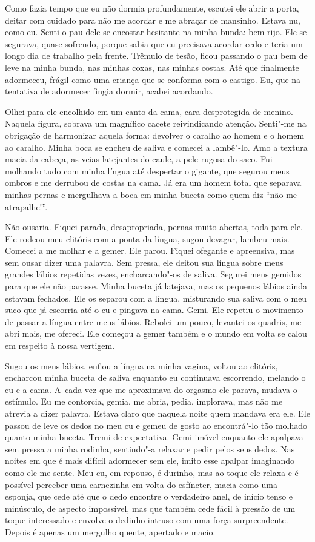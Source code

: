 Como fazia tempo que eu não dormia profundamente, escutei ele abrir a
porta, deitar com cuidado para não me acordar e me abraçar de mansinho.
Estava nu, como eu. Senti o pau dele se encostar hesitante na minha
bunda: bem rijo. Ele se segurava, quase sofrendo, porque sabia que eu
precisava acordar cedo e teria um longo dia de trabalho pela frente.
Trêmulo de tesão, ficou passando o pau bem de leve na minha bunda, nas
minhas coxas, nas minhas costas. Até que finalmente adormeceu, frágil
como uma criança que se conforma com o castigo. Eu, que na tentativa de
adormecer fingia dormir, acabei acordando.

Olhei para ele encolhido em um canto da cama, cara desprotegida de
menino. Naquela figura, sobrava um magnífico cacete reivindicando
atenção. Senti"-me na obrigação de harmonizar aquela forma: devolver o
caralho ao homem e o homem ao caralho. Minha boca se encheu de saliva e
comecei a lambê"-lo. Amo a textura macia da cabeça, as veias latejantes
do caule, a pele rugosa do saco. Fui molhando tudo com minha língua até
despertar o gigante, que segurou meus ombros e me derrubou de costas na
cama. Já era um homem total que separava minhas pernas e mergulhava a
boca em minha buceta como quem diz ``não me atrapalhe!''.

Não ousaria. Fiquei parada, desapropriada, pernas muito abertas, toda
para ele. Ele rodeou meu clitóris com a ponta da língua, sugou devagar,
lambeu mais. Comecei a me molhar e a gemer. Ele parou. Fiquei ofegante e
apreensiva, mas sem ousar dizer uma palavra. Sem pressa, ele deitou sua
língua sobre meus grandes lábios repetidas vezes, encharcando"-os de
saliva. Segurei meus gemidos para que ele não parasse. Minha buceta já
latejava, mas os pequenos lábios ainda estavam fechados. Ele os separou
com a língua, misturando sua saliva com o meu suco que já escorria até o
cu e pingava na cama. Gemi. Ele repetiu o movimento de passar a língua
entre meus lábios. Rebolei um pouco, levantei os quadris, me abri mais,
me ofereci. Ele começou a gemer também e o mundo em volta se calou em
respeito à nossa vertigem.

Sugou os meus lábios, enfiou a língua na minha vagina, voltou ao
clitóris, encharcou minha buceta de saliva enquanto eu continuava
escorrendo, melando o cu e a cama. A~cada vez que me aproximava do
orgasmo ele parava, mudava o estímulo. Eu me contorcia, gemia, me abria,
pedia, implorava, mas não me atrevia a dizer palavra. Estava claro que
naquela noite quem mandava era ele. Ele passou de leve os dedos no meu
cu e gemeu de gosto ao encontrá"-lo tão molhado quanto minha
buceta. Tremi de expectativa. Gemi imóvel enquanto ele apalpava sem
pressa a minha rodinha, sentindo"-a relaxar e pedir pelos seus dedos. Nas
noites em que é mais difícil adormecer sem ele, imito esse apalpar
imaginando como ele me sente. Meu cu, em repouso, é durinho, mas ao
toque ele relaxa e é possível perceber uma carnezinha em volta do
esfíncter, macia como uma esponja, que cede até que o dedo
encontre o verdadeiro anel, de início tenso e minúsculo, de aspecto
impossível, mas que também cede fácil à pressão de um toque interessado
e envolve o dedinho intruso com uma força surpreendente. Depois é apenas
um mergulho quente, apertado e macio.

